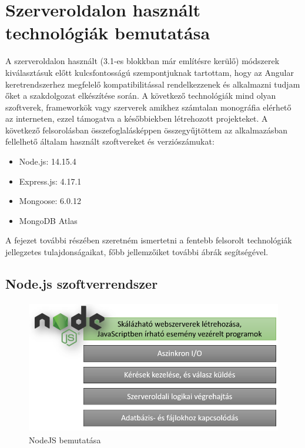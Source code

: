 \section{Szerveroldalon használt technológiák bemutatása}
A szerveroldalon használt (3.1-es blokkban már említésre kerülő) módszerek kiválasztásuk előtt kulcsfontosságú szempontjuknak tartottam, hogy az Angular keretrendszerhez megfelelő kompatibilitással rendelkezzenek és alkalmazni tudjam őket a szakdolgozat elkészítése során. A következő technológiák mind olyan szoftverek, frameworkök vagy szerverek amikhez számtalan monográfia elérhető az interneten, ezzel támogatva a későbbiekben létrehozott projekteket. A következő felsorolásban összefoglalásképpen összegyűjtöttem az alkalmazásban fellelhető általam használt szoftvereket és verziószámukat:

\begin{itemize}
	\item Node.js: 14.15.4
	\item Express.js: 4.17.1
	\item Mongoose: 6.0.12
	\item MongoDB Atlas
\end{itemize}

\bigskip
A fejezet további részében szeretném ismertetni a fentebb felsorolt technológiák jellegzetes tulajdonságaikat, főbb jellemzőiket további ábrák segítségével.

\subsection{Node.js szoftverrendszer}

\begin{figure}[H]
	\centering
	\includegraphics[width=1.0\textwidth,height=220px]{images/nodejs_bemutatasa.png}
	\caption{NodeJS bemutatása}
	\label{fig.picture-3}
\end{figure}

